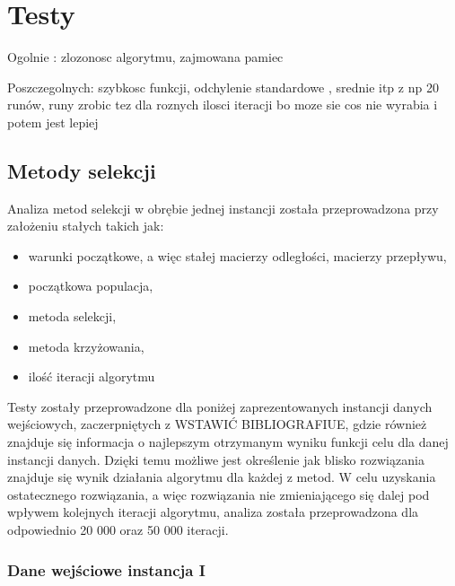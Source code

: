 \chapter{Testy}\label{cha:pierwszyDokument}

Ogolnie :
zlozonosc algorytmu, zajmowana pamiec

Poszczegolnych:
szybkosc funkcji, odchylenie standardowe , srednie itp z np 20 runów, runy zrobic tez dla roznych ilosci iteracji bo moze sie cos nie wyrabia i potem jest lepiej 

\section{Metody selekcji}\label{sec:strukturaDokumentu}

Analiza metod selekcji w obrębie jednej instancji została przeprowadzona przy założeniu stałych takich jak:
\begin{itemize}
\item
 warunki początkowe, a więc stałej macierzy odległości, macierzy przepływu,
\item
początkowa populacja,
\item
metoda selekcji,
\item
metoda krzyżowania,
\item
ilość iteracji algorytmu
\end{itemize}
\par
\vspace{0,4cm}
Testy zostały przeprowadzone dla poniżej zaprezentowanych instancji danych wejściowych, zaczerpniętych z WSTAWIĆ BIBLIOGRAFIUE, gdzie również znajduje się informacja o najlepszym otrzymanym wyniku funkcji celu dla danej instancji danych. Dzięki temu możliwe jest określenie jak blisko rozwiązania znajduje się wynik działania algorytmu dla każdej z metod. W celu uzyskania ostatecznego rozwiązania, a więc rozwiązania nie zmieniającego się dalej pod wpływem kolejnych iteracji algorytmu, analiza została przeprowadzona dla odpowiednio 20 000 oraz 50 000 iteracji.\\

\subsection{Dane wejściowe instancja I}

